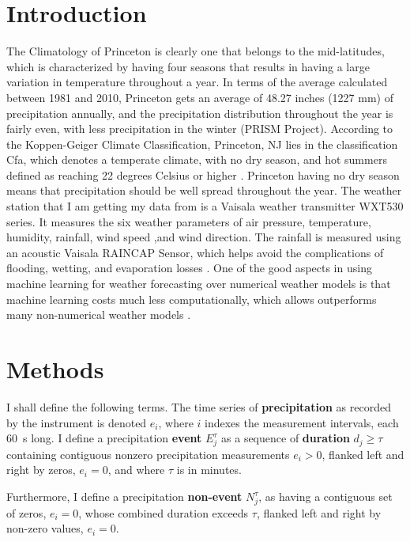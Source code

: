 \documentclass[11pt]{report}
\begin{document}
\section{Introduction \label{sec:introduction}}
The Climatology of Princeton is clearly one that belongs to the mid-latitudes, which is characterized by having four seasons that results in having a large variation in temperature throughout a year. In terms of the average calculated between 1981 and 2010, Princeton gets an average of 48.27 inches (1227 mm) of precipitation annually, and the precipitation distribution throughout the year is fairly even, with less precipitation in the winter (PRISM Project).  According to the Koppen-Geiger Climate Classification, Princeton, NJ lies in the classification Cfa, which denotes a temperate climate, with no dry season, and hot summers defined as reaching 22 degrees Celsius or higher \cite{Peel2008}. Princeton having no dry season means that precipitation should be well spread throughout the year. The weather station that I am getting my data from is a Vaisala weather transmitter WXT530 series. It measures the six weather parameters of air pressure, temperature, humidity, rainfall, wind speed ,and wind direction. The rainfall is measured using an acoustic Vaisala RAINCAP Sensor, which helps avoid the complications of flooding, wetting, and evaporation losses \cite{Vaisala}. One of the good aspects in using machine learning for weather forecasting over numerical weather models is that machine learning costs much less computationally, which allows outperforms many non-numerical weather models \cite{Scher}. 
% 

\section{Methods \label{sec:methods}}

I shall define the following terms. The time series of
\textbf{precipitation} as recorded by the instrument is denoted $e_i$,
where $i$ indexes the measurement intervals, each 60~s long. I define
a precipitation \textbf{event} $E_j^\tau $ as a sequence of
\textbf{duration} $d_j\ge \tau$ containing contiguous nonzero
precipitation measurements $e_i>0$, flanked left and right by zeros,
$e_i=0$, and where $\tau$ is in minutes.

Furthermore, I define a precipitation \textbf{non-event} $N_j^\tau$,
  as having a contiguous set of zeros, $e_i=0$, whose combined duration
  exceeds $\tau$, flanked left and right by non-zero values, $e_i=0$.
\end{document}
